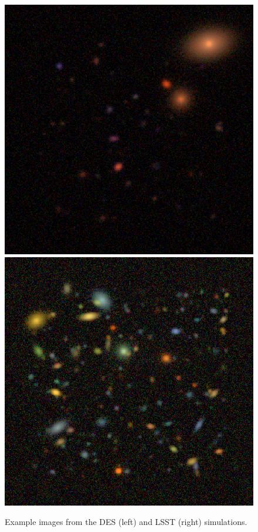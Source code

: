 \documentclass[fleqn,useAMS,usenatbib]{mnras}
\begin{document}
\begin{figure}
    \includegraphics[width=0.9\columnwidth]{figures/des-rgb-000000-crop.png}
    \includegraphics[width=0.9\columnwidth]{figures/lsst-rgb-000003-crop.png}

    \caption{Example images from the DES (left) and LSST (right) simulations.
    \label{fig:simimages}}
\end{figure}
\end{document}
